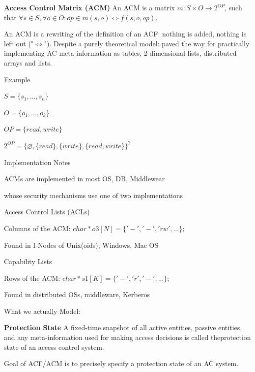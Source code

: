 \documentclass[a4paper]{article}
\renewcommand{\note}[2]{\begin{noteBox} \textbf{#1} #2 \end{noteBox}}
\begin{document}
\begin{multicols}{3}
    \note{Access Control Matrix (ACM)}{An ACM is a matrix $m:S\times O \rightarrow 2^{OP}$, such that $\forall s\in S,\forall o\in O:op\in m(s,o)\Leftrightarrow f(s,o,op)$.}

    An ACM is a rewriting of the definition of an ACF: nothing is added, nothing is left out ("$\Leftrightarrow$"). Despite a purely theoretical model: paved the way for practically implementing AC meta-information as tables, 2-dimensional lists, distributed arrays and lists.

    Example
    \begin{itemize*}
        \item $S=\{s_1 ,...,s_n\}$
        \item $O=\{o_1 ,...,o_k\}$
        \item $OP=\{read,write\}$
        \item $2^{OP}=\{\varnothing,\{read\},\{write\},\{read,write\}\}^2$
    \end{itemize*}

    Implementation Notes
    \begin{itemize*}
        \item ACMs are implemented in most OS, DB, Middlewear
        \item whose security mechanisms use one of two implementations
    \end{itemize*}

    Access Control Lists (ACLs)
    \begin{itemize*}
        \item Columns of the ACM: $char*o3[N]=\{ '-', '-', 'rw', ...\};$
        \item Found in I-Nodes of Unix(oids), Windows, Mac OS
    \end{itemize*}

    Capability Lists
    \begin{itemize*}
        \item Rows of the ACM: $char* s1[K]=\{'-', 'r', '-', ...\};$
        \item Found in distributed OSs, middleware, Kerberos
    \end{itemize*}

    What we actually Model:
    \note{Protection State}{A fixed-time snapshot of all active entities, passive entities, and any meta-information used for making access decisions is called theprotection state of an access control system.}

    Goal of ACF/ACM is to precisely specify a protection state of an AC system.


\end{multicols}
\end{document}

